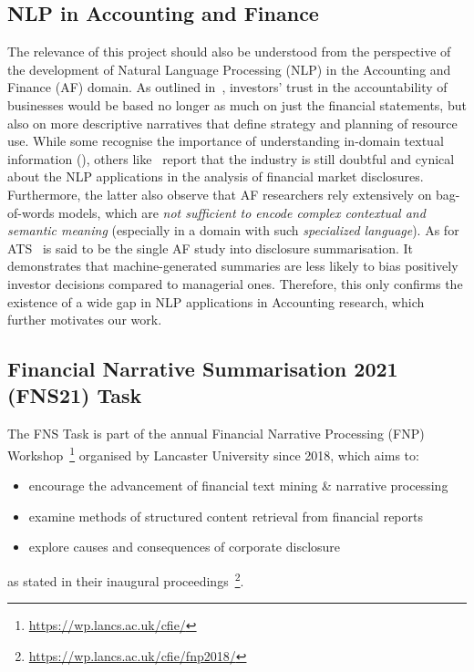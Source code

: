 \subsection{NLP in Accounting and Finance}\label{subsec:nlp-in-accounting-and-finance}
The relevance of this project should also be understood from the perspective of the development of Natural Language Processing (NLP) in the Accounting and Finance (AF) domain.
As outlined in~\cite{elliott1998accounting}, investors’ trust in the accountability of businesses would be based no longer as much on just the financial statements, but also on more descriptive narratives that define strategy and planning of resource use.
While some recognise the importance of understanding in-domain textual information (\cite{li2010textual}), others like~\cite{el-haj2019meaning} report that the industry is still doubtful and cynical about the NLP applications in the analysis of financial market disclosures.
Furthermore, the latter also observe that AF researchers rely extensively on bag-of-words models, which are \emph{not sufficient to encode complex contextual and semantic meaning} (especially in a domain with such \emph{specialized language}).
As for ATS~\cite{hollander-white-af} is said to be the single AF study into disclosure summarisation.
It demonstrates that machine-generated summaries are less likely to bias positively investor decisions compared to managerial ones.
Therefore, this only confirms the existence of a wide gap in NLP applications in Accounting research, which further motivates our work.

\subsection{Financial Narrative Summarisation 2021 (FNS21) Task} \label{subsec:fns}
The FNS Task is part of the annual Financial Narrative Processing (FNP) Workshop~\footnote{\url{https://wp.lancs.ac.uk/cfie/}} organised by Lancaster University since 2018, which aims to:
\begin{itemize}
    \item encourage the advancement of financial text mining \& narrative processing
    \item examine methods of structured content retrieval from financial reports
    \item explore causes and consequences of corporate disclosure
\end{itemize} as stated in their inaugural proceedings~\footnote{\url{https://wp.lancs.ac.uk/cfie/fnp2018/}}.

